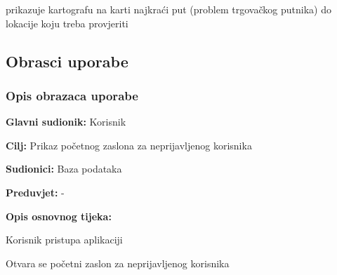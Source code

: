 \begin{packed_enum}
\begin{packed_enum}
				\end{packed_enum}
			\item  {}
			
			\begin{packed_enum}
				
				\item prikazuje kartografu na karti najkraći put (problem trgovačkog putnika) do lokacije koju treba provjeriti
				
			\end{packed_enum}
			\end{packed_enum}
			
			\eject 
			
			
				
			\subsection{Obrasci uporabe}
		
				\subsubsection{Opis obrazaca uporabe}
				
					\noindent {}
					\begin{packed_item}
						
						\item \textbf{Glavni sudionik: }Korisnik
						\item  \textbf{Cilj:} Prikaz početnog zaslona za neprijavljenog korisnika
						\item  \textbf{Sudionici:} Baza podataka
						\item  \textbf{Preduvjet:} -
						\item  \textbf{Opis osnovnog tijeka:}
						
						\item[] \begin{packed_enum}
							
							\item Korisnik pristupa aplikaciji
							\item Otvara se početni zaslon za neprijavljenog korisnika
						\end{packed_enum}
					\end{packed_item}
					
